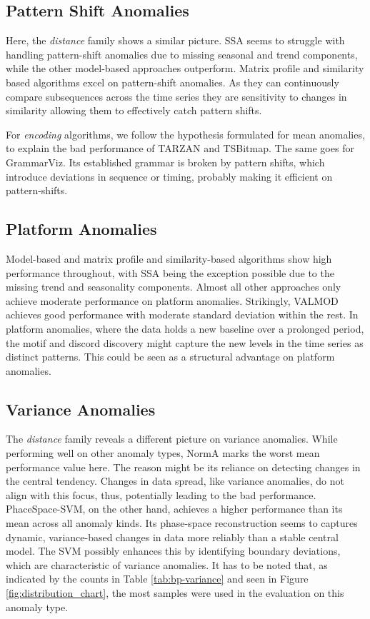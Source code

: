 \subsection{Pattern Shift Anomalies}
    
    Here, the \textit{distance} family shows a similar picture. SSA seems to struggle with handling pattern-shift anomalies due to missing seasonal and trend components, while the other model-based approaches outperform.
    Matrix profile and similarity based algorithms excel on pattern-shift anomalies. As they can continuously compare subsequences across the time series they are sensitivity to changes in similarity allowing them to effectively catch pattern shifts.

    For \textit{encoding} algorithms, we follow the hypothesis formulated for mean anomalies, to explain the bad performance of TARZAN and TSBitmap. The same goes for GrammarViz. Its established grammar is broken by pattern shifts, which introduce deviations in sequence or timing, probably making it efficient on pattern-shifts.
    
\subsection{Platform Anomalies}
    
    Model-based and matrix profile and similarity-based algorithms show high performance throughout, with SSA being the exception possible due to the missing trend and seasonality components.
    Almost all other approaches only achieve moderate performance on platform anomalies. Strikingly, VALMOD achieves good performance with moderate standard deviation within the rest. In platform anomalies, where the data holds a new baseline over a prolonged period, the motif and discord discovery might capture the new levels in the time series as distinct patterns. This could be seen as a structural advantage on platform anomalies.
    
\subsection{Variance Anomalies}
    
    The \textit{distance} family reveals a different picture on variance anomalies. While performing well on other anomaly types, NormA marks the worst mean performance value here. The reason might be its reliance on detecting changes in the central tendency. Changes in data spread, like variance anomalies, do not align with this focus, thus, potentially leading to the bad performance.
    PhaceSpace-SVM, on the other hand, achieves a higher performance than its mean across all anomaly kinds. Its phase-space reconstruction seems to captures dynamic, variance-based changes in data more reliably than a stable central model. The SVM possibly enhances this by identifying boundary deviations, which are characteristic of variance anomalies. 
    It has to be noted that, as indicated by the counts in Table \ref{tab:bp-variance} and seen in Figure \ref{fig:distribution_chart}, the most samples were used in the evaluation on this anomaly type.
    
